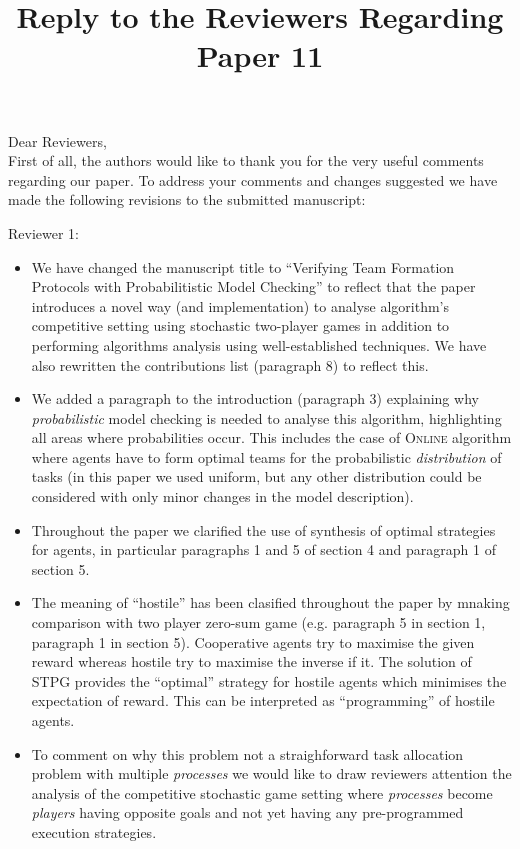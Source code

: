 \documentclass[a4paper,10pt]{article}
\title{Reply to the Reviewers Regarding Paper 11}
\author{}
\begin{document}
\maketitle

\noindent Dear Reviewers, \\

\noindent First of all, the authors would like to thank you for the very useful comments regarding our paper.
To address your comments and changes suggested we have made the following revisions to the submitted manuscript:

\noindent Reviewer 1:
\begin{itemize}

\item We have changed the manuscript title to "`Verifying Team Formation Protocols with Probabilitistic Model Checking"' to reflect that the paper introduces a novel way (and implementation) to analyse algorithm's competitive setting using stochastic two-player games in addition to performing algorithms analysis using well-established techniques. We have also rewritten the contributions list (paragraph 8) to reflect this.

\item We added a paragraph to the introduction (paragraph 3) explaining why \emph{probabilistic} model checking is needed to analyse this algorithm, highlighting all areas where probabilities occur. This includes the case of \textsc{Online} algorithm where agents have to form optimal teams for the probabilistic \emph{distribution} of tasks (in this paper we used uniform, but any other distribution could be considered with only minor changes in the model description).

\item Throughout the paper we clarified the use of synthesis of optimal strategies for agents, in particular paragraphs 1 and 5 of section 4 and paragraph 1 of section 5.

\item The meaning of ``hostile'' has been clasified throughout the paper by mnaking comparison with two player zero-sum game (e.g. paragraph 5 in section 1, paragraph 1 in section 5). Cooperative agents try to maximise the given reward whereas hostile try to maximise the inverse if it. The solution of STPG provides the ``optimal'' strategy for hostile agents which minimises the expectation of reward. This can be interpreted as ``programming'' of hostile agents.

\item To comment on why this problem not a straighforward task allocation problem with multiple \emph{processes} we would like to draw reviewers attention the analysis of the competitive stochastic game setting where \emph{processes} become \emph{players} having opposite goals and not yet having any pre-programmed execution strategies.

\end{itemize}
\end{document}

